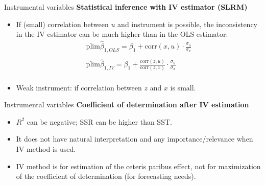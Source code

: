 \documentclass[usenames,dvipsnames]{beamer}
\begin{document}
\begin{frame}{Instrumental variables}
\textbf{Statistical inference with IV estimator (SLRM)}\\
\bigskip
\begin{itemize}
\item If (small) correlation between $u$ and instrument is possible, the inconsistency in the IV estimator can be much higher than in the OLS estimator:
\vspace{0.3cm}
\begin{align*}
\mathrm{plim}\hat{\beta}_{1, OLS} = \beta_1 + \mathrm{corr}(x, u) \cdot \frac{\sigma_u}{\sigma_x} \\
~\\
\mathrm{plim}\hat{\beta}_{1, IV} = \beta_1 + \frac{\mathrm{corr}(z, u)}{\mathrm{corr}(z, x)} \cdot \frac{\sigma_u}{\sigma_x} \\
\end{align*}

\item Weak instrument: if correlation between  $z$ and $x$ is small.
\end{itemize}
\end{frame}
\begin{frame}{Instrumental variables}
\textbf{Coefficient of determination after IV estimation}
\vspace{0.3cm}
\begin{itemize}
\item $R^2$ can be negative;  SSR can be higher than SST.
\vspace{0.3cm}
\item It does not have natural interpretation and any importance/relevance when IV method is used. 
\vspace{0.3cm}
\item IV method is for estimation of the ceteris paribus effect, not for maximization of the coefficient of determination (for forecasting needs).
\end{itemize}
\end{frame}
\end{document}
